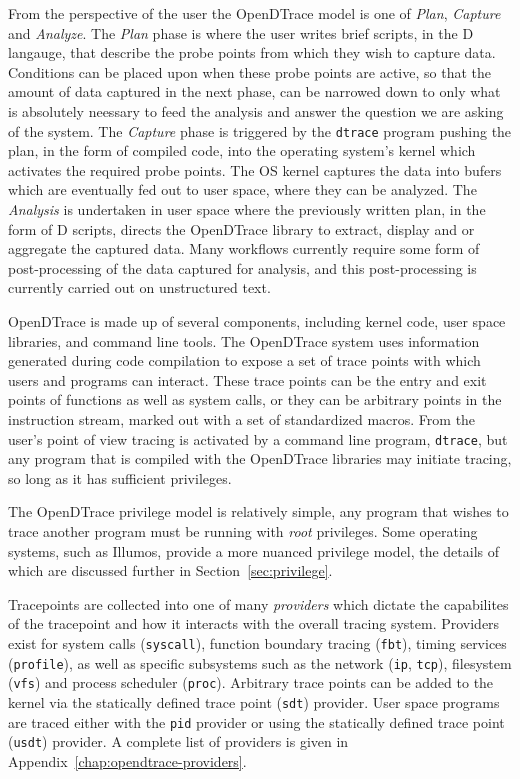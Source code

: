 From the perspective of the user the OpenDTrace model is one of
\emph{Plan}, \emph{Capture} and \emph{Analyze}.  The \emph{Plan} phase
is where the user writes brief scripts, in the D langauge, that
describe the probe points from which they wish to capture data.
Conditions can be placed upon when these probe points are active, so
that the amount of data captured in the next phase, can be narrowed
down to only what is absolutely neessary to feed the analysis and
answer the question we are asking of the system.  The \emph{Capture}
phase is triggered by the \texttt{dtrace} program pushing the plan,
in the form of compiled code, into the operating system's kernel which
activates the required probe points.  The OS kernel captures the data
into bufers which are eventually fed out to user space, where they can
be analyzed.  The \emph{Analysis} is undertaken in user space where
the previously written plan, in the form of D scripts, directs the
OpenDTrace library to extract, display and or aggregate the captured
data.  Many workflows currently require some form of post-processing
of the data captured for analysis, and this post-processing is
currently carried out on unstructured text.

OpenDTrace is made up of several components, including kernel code,
user space libraries, and command line tools.  The OpenDTrace system
uses information generated during code compilation to expose a set of
trace points with which users and programs can interact.  These trace
points can be the entry and exit points of functions as well as system
calls, or they can be arbitrary points in the instruction stream,
marked out with a set of standardized macros.  From the user's point
of view tracing is activated by a command line program,
\texttt{dtrace}, but any program that is compiled with the OpenDTrace
libraries may initiate tracing, so long as it has sufficient
privileges.

The OpenDTrace privilege model is relatively simple, any program that
wishes to trace another program must be running with \emph{root}
privileges.  Some operating systems, such as Illumos, provide a more
nuanced privilege model, the details of which are discussed further in
Section~\ref{sec:privilege}.

Tracepoints are collected into one of many \emph{providers} which dictate
the capabilites of the tracepoint and how it interacts with the overall
tracing system.  Providers exist for system calls (\texttt{syscall}),
function boundary tracing (\texttt{fbt}), timing services (\texttt{profile}),
as well as specific subsystems such as the network (\texttt{ip}, \texttt{tcp}),
filesystem (\texttt{vfs}) and process scheduler (\texttt{proc}).
Arbitrary trace points can be added to the kernel via the
statically defined trace point (\texttt{sdt}) provider.  User space programs
are traced either with the \texttt{pid} provider or using the 
statically defined trace point (\texttt{usdt}) provider.  A complete
list of providers is given in Appendix~\ref{chap:opendtrace-providers}.

